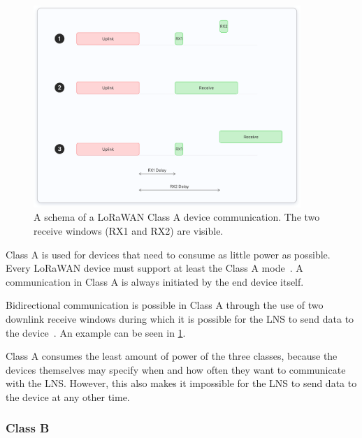 \begin{figure}[htbp]
    \centering
    \includegraphics[width=0.9\textwidth]{pictures/device-classes/class-a.png}
    \caption{
        A schema of a \ac{LoRaWAN} Class A device communication.
        The two receive windows (RX1 and RX2) are visible.~\protect\cite{the_things_industries_bv_device_nodate}
    }\label{pic:lorawan-device-class-a-schema}
\end{figure}

Class A is used for devices that need to consume as little power as possible.
Every \ac{LoRaWAN} device must support at least the Class A mode~\cite[p. 11]{lora_alliance_inc_lorawan_specification_2017}.
A communication in Class A is always initiated by the end device itself.

Bidirectional communication is possible in Class A through the use of two downlink receive windows during which it is possible for the \ac{LNS} to send data to the device~\cite[p. 13]{lora_alliance_inc_lorawan_specification_2017}.
An example can be seen in \cref{pic:lorawan-device-class-a-schema}.

Class A consumes the least amount of power of the three classes, because the devices themselves may specify when and how often they want to communicate with the \ac{LNS}.
However, this also makes it impossible for the \ac{LNS} to send data to the device at any other time.

\subsubsection{Class B}

